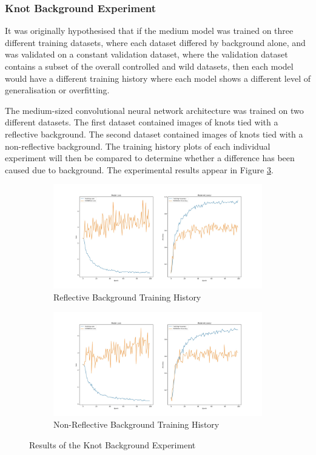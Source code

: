 \documentclass{l4proj}
\begin{document}
\subsubsection{Knot Background Experiment}
It was originally hypothesised that if the medium model was trained on three different training datasets, where each dataset differed by background alone, and was validated on a constant validation dataset, where the validation dataset contains a subset of the overall controlled and wild datasets, then each model would have a different training history where each model shows a different level of generalisation or overfitting.

The medium-sized convolutional neural network architecture was trained on two different datasets.
The first dataset contained images of knots tied with a reflective background.
The second dataset contained images of knots tied with a non-reflective background.
The training history plots of each individual experiment will then be compared to determine whether a difference has been caused due to background.
The experimental results appear in Figure \ref{fig:KnotBackgroundResults}.

\begin{figure}[h]
	\begin{subfigure}{\textwidth}
		\centering
        \includegraphics[width=\linewidth]{eval/reflectBackgroundResult}
        \caption{Reflective Background Training History}
        \label{fig:ReflectBackgroundExperiment}
	\end{subfigure}
	\begin{subfigure}{\textwidth}
		\centering
        \includegraphics[width=\linewidth]{eval/nonReflectBackgroundResult}
        \caption{Non-Reflective Background Training History}
        \label{fig:NonReflectBackgroundExperiment}
	\end{subfigure}
	\caption{Results of the Knot Background Experiment}
    \label{fig:KnotBackgroundResults}
\end{figure}
\end{document}

